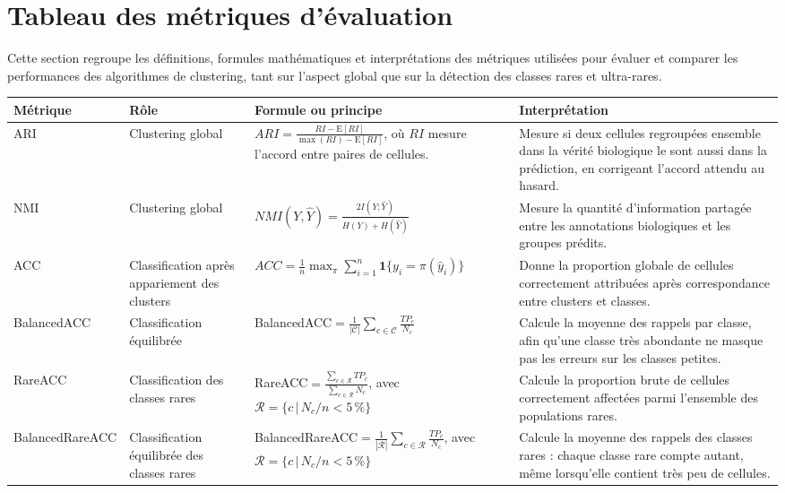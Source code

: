 \newpage
\section{Tableau des métriques d'évaluation}
\label{annexe:metriques}

Cette section regroupe les définitions, formules mathématiques et interprétations des métriques utilisées pour évaluer et comparer les performances des algorithmes de clustering, tant sur l'aspect global que sur la détection des classes rares et ultra-rares.

\begin{table}[H]
    \centering
    \scriptsize
    \renewcommand{\arraystretch}{1.2}
    \begin{tabularx}{\textwidth}{@{}p{}p{}p{}X@{}}
        \toprule
        \textbf{Métrique} & \textbf{Rôle} & \textbf{Formule ou principe} & \textbf{Interprétation} \\
        \midrule
        ARI & Clustering global & \(ARI=\frac{RI-\mathrm{E}[RI]}{\max(RI)-\mathrm{E}[RI]}\), où \(RI\) mesure l'accord entre paires de cellules. & Mesure si deux cellules regroupées ensemble dans la vérité biologique le sont aussi dans la prédiction, en corrigeant l'accord attendu au hasard. \\
        NMI & Clustering global & \(NMI(Y,\hat{Y})=\frac{2I(Y;\hat{Y})}{H(Y)+H(\hat{Y})}\) & Mesure la quantité d'information partagée entre les annotations biologiques et les groupes prédits. \\
        ACC & Classification après appariement des clusters & \(ACC=\frac{1}{n}\max_{\pi}\sum_{i=1}^{n}\mathbf{1}\{y_i=\pi(\hat{y}_i)\}\) & Donne la proportion globale de cellules correctement attribuées après correspondance entre clusters et classes. \\
        BalancedACC & Classification équilibrée & BalancedACC\({}=\frac{1}{|\mathcal{C}|}\sum_{c\in\mathcal{C}}\frac{TP_c}{N_c}\) & Calcule la moyenne des rappels par classe, afin qu'une classe très abondante ne masque pas les erreurs sur les classes petites. \\
        RareACC & Classification des classes rares & RareACC\({}=\frac{\sum_{c\in\mathcal{R}}TP_c}{\sum_{c\in\mathcal{R}}N_c}\), avec \(\mathcal{R}=\{c\,|\,N_c/n<5\,\%\}\) & Calcule la proportion brute de cellules correctement affectées parmi l'ensemble des populations rares. \\
        BalancedRareACC & Classification équilibrée des classes rares & BalancedRareACC\({}=\frac{1}{|\mathcal{R}|}\sum_{c\in\mathcal{R}}\frac{TP_c}{N_c}\), avec \(\mathcal{R}=\{c\,|\,N_c/n<5\,\%\}\) & Calcule la moyenne des rappels des classes rares : chaque classe rare compte autant, même lorsqu'elle contient très peu de cellules. \\

\end{tabularx}
\end{table}
